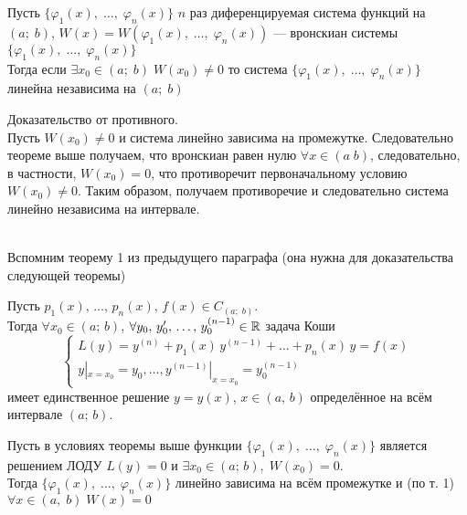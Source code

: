 \begin{Note}
    Пусть $\{\varphi_1(x),\; \dots,\; \varphi_n(x)\}$ $n$ раз диференцируемая система функций на $(a;\;b)$, $W(x) = W(\varphi_1(x),\; \dots,\; \varphi_n(x))$ --- вронскиан системы $\{\varphi_1(x),\; \dots,\; \varphi_n(x)\}$\\
    
    Тогда если $\exists x_0 \in (a;\;b) \; W(x_0) \neq 0$ то система $\{\varphi_1(x),\; \dots,\; \varphi_n(x)\}$ линейна независима на $(a;\;b)$
\end{Note}

\begin{Proof}
    Доказательство от противного.\\
    Пусть $W(x_0) \neq 0$ и система линейно зависима на промежутке. Следовательно теореме выше получаем, что вронскиан равен нулю $\forall x\in(a\;b)$, следовательно, в частности, $W(x_0) = 0$, что противоречит первоначальному условию $W(x_0) \neq 0$. Таким образом, получаем противоречие и следовательно система линейно независима на интервале. 
\end{Proof}\\

Вспомним теорему 1 из предыдущего параграфа (она нужна для доказательства следующей теоремы)
\begin{Th}
    Пусть $p_1(x),\, \dots,\, p_n(x), \,f(x) \in C_{(a;\;b)}$.\\ 
    Тогда $\forall x_0 \in (a;\,b)$, $\forall y_0,\, y_0',\, \dots,\, y_0^{(n-1)} \in \mathbb{R}$ задача Коши
    \[
        \begin{cases}
            L(y) = y^{(n)}+p_1(x)\,y^{(n-1)}+\dots+p_n(x)\,y=f(x)\\
            y|_{x=x_0}=y_0, \dots , y^{(n-1)}|_{x=x_0}=y_0^{(n-1)}
        \end{cases}
    \]
    имеет единственное решение $y=y(x)$, $x\in (a,\,b)$ определённое на всём интервале $(a;\,b)$.
\end{Th}

\begin{Th}
    Пусть в условиях теоремы выше функции $\{\varphi_1(x),\; \dots,\; \varphi_n(x)\}$ является решением ЛОДУ $L(y) = 0$ и $\exists x_0 \in (a;\, b),\; W(x_0) = 0$.\\
    
    Тогда $\{\varphi_1(x),\; \dots,\; \varphi_n(x)\}$ линейно зависима на всём промежутке и (по т. 1) $\forall x \in (a,\;b)\; W(x) = 0$
\end{Th}

